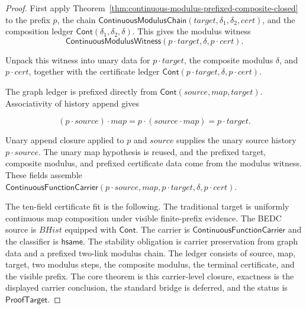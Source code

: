 \begin{proof}
First apply Theorem~\ref{thm:continuous-modulus-prefixed-composite-closed} to
the prefix $p$, the chain
$\mathsf{ContinuousModulusChain}(target,\delta_1,\delta_2,cert)$, and the
composition ledger $\mathsf{Cont}(\delta_1,\delta_2,\delta)$. This gives the
modulus witness
$$
\mathsf{ContinuousModulusWitness}(p\cdot target,\delta,p\cdot cert).
$$

Unpack this witness into unary data for $p\cdot target$, the composite modulus
$\delta$, and $p\cdot cert$, together with the certificate ledger
$\mathsf{Cont}(p\cdot target,\delta,p\cdot cert)$.

The graph ledger is prefixed directly from
$\mathsf{Cont}(source,map,target)$. Associativity of history append gives

$$
(p\cdot source)\cdot map
=
p\cdot(source\cdot map)
=
p\cdot target.
$$

Unary append closure applied to $p$ and $source$ supplies the unary source
history $p\cdot source$. The unary map hypothesis is reused, and the prefixed
target, composite modulus, and prefixed certificate data come from the modulus
witness. These fields assemble
$\mathsf{ContinuousFunctionCarrier}(p\cdot source,map,p\cdot target,\delta,
p\cdot cert)$.

The ten-field certificate fit is the following. The traditional target is
uniformly continuous map composition under visible finite-prefix evidence. The
BEDC source is $BHist$ equipped with $\mathsf{Cont}$. The carrier is
$\mathsf{ContinuousFunctionCarrier}$ and the classifier is $\mathsf{hsame}$. The
stability obligation is carrier preservation from graph data and a prefixed
two-link modulus chain. The ledger consists of source, map, target, two modulus
steps, the composite modulus, the terminal certificate, and the visible prefix.
The core theorem is this carrier-level closure, exactness is the displayed
carrier conclusion, the standard bridge is deferred, and the status is
$\mathsf{ProofTarget}$.
\end{proof}

